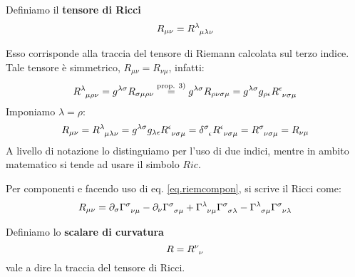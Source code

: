 \begin{definizione}
Definiamo il \textbf{tensore di Ricci}
\begin{equation*}
    R_{\mu\nu} = \tensor{R}{^\lambda_{\mu\lambda\nu}}
\end{equation*}
\end{definizione}
Esso corrisponde alla traccia del tensore di Riemann calcolata sul terzo indice. Tale tensore è simmetrico, $R_{\mu\nu}=R_{\nu\mu}$, infatti:
\begin{align*}
    \tensor{R}{^\lambda_{\mu\rho\nu}} = g^{\lambda\sigma} R_{\sigma\mu\rho\nu} \overset{\text{prop. }3)}{=} g^{\lambda\sigma} R_{\rho\nu\sigma\mu} = g^{\lambda\sigma}g_{\rho\epsilon} \tensor{R}{^\epsilon_{\nu\sigma\mu}} 
\end{align*}
Imponiamo $\lambda = \rho$:
\begin{align*}
    R_{\mu\nu}= \tensor{R}{^\lambda_{\mu\lambda\nu}} = g^{\lambda\sigma}g_{\lambda\epsilon} \tensor{R}{^\epsilon_{\nu\sigma\mu}} = \tensor{\delta}{^\sigma_\epsilon} \tensor{R}{^\epsilon_{\nu\sigma\mu}} =\tensor{R}{^\sigma_{\nu\sigma\mu}} = R_{\nu\mu}
\end{align*}
A livello di notazione lo distinguiamo per l'uso di due indici, mentre in ambito matematico si tende ad usare il simbolo $Ric$.

Per componenti e facendo uso di eq. \ref{eq.riemcompon}, si scrive il Ricci come:
\begin{equation}
    R_{\mu\nu}= \partial_\sigma\tensor{\Gamma}{^\sigma_{\nu\mu}}- \partial_\nu\tensor{\Gamma}{^\sigma_{\sigma\mu}} +\tensor{\Gamma}{^\lambda_{\nu\mu}} \tensor{\Gamma}{^\sigma_{\sigma\lambda}} - \tensor{\Gamma}{^\lambda_{\sigma\mu}} \tensor{\Gamma}{^\sigma_{\nu\lambda}}
    \label{eq.riccicomponenti}
\end{equation}
\begin{definizione}
Definiamo lo \textbf{scalare di curvatura}
\begin{equation*}
    R = \tensor{R}{^\nu_\nu}
\end{equation*}
vale a dire la traccia del tensore di Ricci.
\end{definizione}

